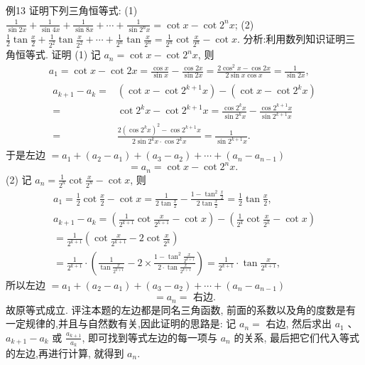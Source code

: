 例13 证明下列三角恒等式:
(1) $\frac{1}{\sin 2 x}+\frac{1}{\sin 4 x}+\frac{1}{\sin 8 x}+\cdots+\frac{1}{\sin 2^n x}=\cot x-\cot 2^n x$;
(2) $\frac{1}{2} \tan \frac{x}{2}+\frac{1}{2^2} \tan \frac{x}{2^2}+\cdots+\frac{1}{2^n} \tan \frac{x}{2^n}=\frac{1}{2^n} \cot \frac{x}{2^n}-\cot x$.
分析:利用数列知识证明三角恒等式.
证明 (1) 记 $a_n=\cot x-\cot 2^n x$, 则
$$
\begin{gathered}
a_1=\cot x-\cot 2 x=\frac{\cos x}{\sin x}-\frac{\cos 2 x}{\sin 2 x}=\frac{2 \cos ^2 x-\cos 2 x}{2 \sin x \cos x}=\frac{1}{\sin 2 x}, \\
\begin{aligned}
a_{k+1}-a_k= & \left(\cot x-\cot 2^{k+1} x\right)-\left(\cot x-\cot 2^k x\right) \\
= & \cot 2^k x-\cot 2^{k+1} x=\frac{\cos 2^k x}{\sin 2^k x}-\frac{\cos 2^{k+1} x}{\sin 2^{k+1} x} \\
= & \frac{2\left(\cos 2^k x\right)^2-\cos 2^{k+1} x}{2 \sin 2^k x \cdot \cos 2^k x}=\frac{1}{\sin 2^{k+1} x} .
\end{aligned}
\end{gathered}
$$
于是左边 $=a_1+\left(a_2-a_1\right)+\left(a_3-a_2\right)+\cdots+\left(a_n-a_{n-1}\right)$
$$
=a_n=\cot x-\cot 2^n x \text {. }
$$
(2) 记 $a_n=\frac{1}{2^n} \cot \frac{x}{2^n}-\cot x$, 则
$$
\begin{aligned}
a_1=\frac{1}{2} \cot \frac{x}{2}-\cot x=\frac{1}{2 \tan \frac{x}{2}}-\frac{1-\tan ^2 \frac{x}{2}}{2 \tan \frac{x}{2}}=\frac{1}{2} \tan \frac{x}{2}, \\
a_{k+1}-a_k=\left(\frac{1}{2^{k+1}} \cot \frac{x}{2^{k+1}}-\cot x\right)-\left(\frac{1}{2^k} \cot \frac{x}{2^k}-\cot x\right) \\
=\frac{1}{2^{k+1}}\left(\cot \frac{x}{2^{k+1}}-2 \cot \frac{x}{2^k}\right) \\
=\frac{1}{2^{k+1}} \cdot\left(\frac{1}{\tan \frac{x}{2^{k+1}}}-2 \times \frac{1-\tan ^2 \frac{x}{2^{k+1}}}{2 \cdot \tan \frac{x}{2^{k+1}}}\right)=\frac{1}{2^{k+1}} \cdot \tan \frac{x}{2^{k+1}},
\end{aligned}
$$
所以左边 $=a_1+\left(a_2-a_1\right)+\left(a_3-a_2\right)+\cdots+\left(a_n-a_{n-1}\right)$
$$
=a_n=\text { 右边.
}
$$
故原等式成立.
评注本题的左边都是同名三角函数, 前面的系数以及角的度数是有一定规律的,并且与自然数有关,因此证明的思路是: 记 $a_n=$ 右边, 然后求出 $a_1$ 、 $a_{k+1}-a_k$ 或 $\frac{a_{k+1}}{a_k}$, 即可找到等式左边的每一项与 $a_n$ 的关系, 最后把它们代入等式的左边,再进行计算, 就得到 $a_n$.



